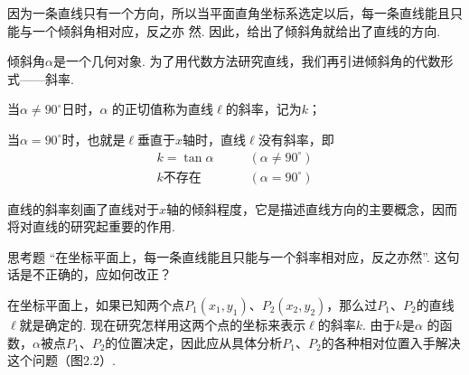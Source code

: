 因为一条直线只有一个方向，所以当平面直角坐标系选定以后，每一条直线能且只能与一个倾斜角相对应，反之亦
然. 因此，给出了倾斜角就给出了直线的方向.

倾斜角$\alpha$是一个几何对象. 为了用代数方法研究直线，我们再引进倾斜角的代数形式——斜率.

当$\alpha \ne 90^{\circ}$日时，$\alpha$ 的正切值称为直线$\ell$的斜率，记为$k$；

当$\alpha =90^{\circ}$时，也就是$\ell$垂直于$x$轴时，直线$\ell$没有斜率，即
\begin{equation}
\begin{split}
   k= \tan\alpha &\qquad (\alpha\ne 90^{\circ})\\
   k\text{不存在}&\qquad (\alpha= 90^{\circ})
\end{split} \tag{1}
\end{equation}

直线的斜率刻画了直线对于$x$轴的倾斜程度，它是描述直线方向的主要概念，因而将对直线的研究起重要的作用.

\begin{thm}
{思考题}
“在坐标平面上，每一条直线能且只能与一个斜率相对应，反之亦然”. 这句话是不正确的，应如何改正？    
\end{thm}

在坐标平面上，如果已知两个点$P_1(x_1,y_1)$、$P_2(x_2,y_2)$，那么过$P_1$、$P_2$的直线$\ell$就是确定的. 现在研究怎样用这两个点的坐标来表示$\ell$的斜率$k$. 由于$k$是$\alpha$ 的函数，$\alpha$被点$P_1$、$P_2$的位置决定，因此应从具体分析$P_1$、$P_2$的各种相对位置入手解决这个问题（图2.2）.

